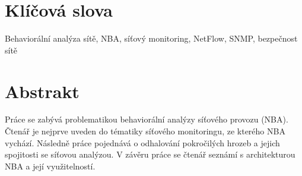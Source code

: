 \vspace*{\fill}
\section*{Klíčová slova}

Behaviorální analýza sítě, NBA, síťový monitoring, NetFlow, SNMP, bezpečnost sítě

\section*{Abstrakt}

Práce se zabývá problematikou behaviorální analýzy síťového provozu (NBA).
Čtenář je nejprve uveden do tématiky síťového monitoringu, ze kterého NBA vychází.
Následně práce pojednává o odhalování pokročilých hrozeb a jejich spojitosti se síťovou analýzou.
V závěru práce se čtenář seznámí s architekturou NBA a její využitelností.

\thispagestyle{empty}

\newpage

\tableofcontents
\thispagestyle{empty}

\newpage
